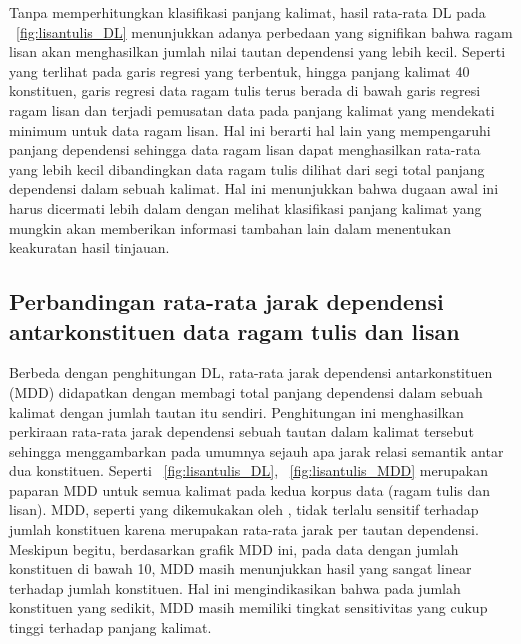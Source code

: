 Tanpa memperhitungkan klasifikasi panjang kalimat, hasil rata-rata DL pada \pic~\ref{fig:lisantulis_DL} menunjukkan adanya perbedaan yang signifikan bahwa ragam lisan akan menghasilkan jumlah nilai tautan dependensi yang lebih kecil. Seperti yang terlihat pada garis regresi yang terbentuk, hingga panjang kalimat 40 konstituen, garis regresi data ragam tulis terus berada di bawah garis regresi ragam lisan dan terjadi pemusatan data pada panjang kalimat yang mendekati minimum untuk data ragam lisan. Hal ini berarti hal lain yang mempengaruhi panjang dependensi sehingga data ragam lisan dapat menghasilkan rata-rata yang lebih kecil dibandingkan data ragam tulis dilihat dari segi total panjang dependensi dalam sebuah kalimat. Hal ini menunjukkan bahwa dugaan awal ini harus dicermati lebih dalam dengan melihat klasifikasi panjang kalimat yang mungkin akan memberikan informasi tambahan lain dalam menentukan keakuratan hasil tinjauan. 

\subsection{Perbandingan rata-rata jarak dependensi antarkonstituen data ragam tulis dan lisan}

Berbeda dengan penghitungan DL, rata-rata jarak dependensi antarkonstituen (MDD) didapatkan dengan membagi total panjang dependensi dalam sebuah kalimat dengan jumlah tautan itu sendiri. Penghitungan ini menghasilkan perkiraan rata-rata jarak dependensi sebuah tautan dalam kalimat tersebut sehingga menggambarkan pada umumnya sejauh apa jarak relasi semantik antar dua konstituen. Seperti \pic~\ref{fig:lisantulis_DL}, \pic~\ref{fig:lisantulis_MDD} merupakan paparan MDD untuk semua kalimat pada kedua korpus data (ragam tulis dan lisan). MDD, seperti yang dikemukakan oleh \cite{liu2017dependency}, tidak terlalu sensitif terhadap jumlah konstituen karena merupakan rata-rata jarak per tautan dependensi. Meskipun begitu, berdasarkan grafik MDD ini, pada data dengan jumlah konstituen di bawah 10, MDD masih menunjukkan hasil yang sangat linear terhadap jumlah konstituen. Hal ini mengindikasikan bahwa pada jumlah konstituen yang sedikit, MDD masih memiliki tingkat sensitivitas yang cukup tinggi terhadap panjang kalimat.

